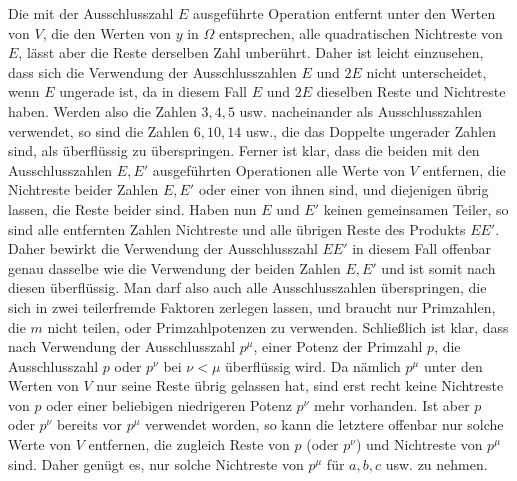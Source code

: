 Die mit der Ausschlusszahl \(E\) ausgeführte Operation entfernt unter den Werten von \(V\), die den Werten von \(y\) in \(\Omega\) entsprechen, alle quadratischen Nichtreste von \(E\), lässt aber die Reste derselben Zahl unberührt. Daher ist leicht einzusehen, dass sich die Verwendung der Ausschlusszahlen \(E\) und \(2E\) nicht unterscheidet, wenn \(E\) ungerade ist, da in diesem Fall \(E\) und \(2E\) dieselben Reste und Nichtreste haben. Werden also die Zahlen \(3,\allowbreak 4,\allowbreak 5\) usw. nacheinander als Ausschlusszahlen verwendet, so sind die Zahlen \(6,\allowbreak 10,\allowbreak 14\) usw., die das Doppelte ungerader Zahlen sind, als überflüssig zu überspringen. Ferner ist klar, dass die beiden mit den Ausschlusszahlen \(E,\allowbreak E'\) ausgeführten Operationen alle Werte von \(V\) entfernen, die Nichtreste beider Zahlen \(E,\allowbreak E'\) oder einer von ihnen sind, und diejenigen übrig lassen, die Reste beider sind. Haben nun \(E\) und \(E'\) keinen gemeinsamen Teiler, so sind alle entfernten Zahlen Nichtreste und alle übrigen Reste des Produkts \(EE'\). Daher bewirkt die Verwendung der Ausschlusszahl \(EE'\) in diesem Fall offenbar genau dasselbe wie die Verwendung der beiden Zahlen \(E,\allowbreak E'\) und ist somit nach diesen überflüssig. Man darf also auch alle Ausschlusszahlen überspringen, die sich in zwei teilerfremde Faktoren zerlegen lassen, und braucht nur Primzahlen, die \(m\) nicht teilen, oder Primzahlpotenzen zu verwenden. Schließlich ist klar, dass nach Verwendung der Ausschlusszahl \(p^\mu\), einer Potenz der Primzahl \(p\), die Ausschlusszahl \(p\) oder \(p^\nu\) bei \(\nu<\mu\) überflüssig wird. Da nämlich \(p^\mu\) unter den Werten von \(V\) nur seine Reste übrig gelassen hat, sind erst recht keine Nichtreste von \(p\) oder einer beliebigen niedrigeren Potenz \(p^\nu\) mehr vorhanden. Ist aber \(p\) oder \(p^\nu\) bereits vor \(p^\mu\) verwendet worden, so kann die letztere offenbar nur solche Werte von \(V\) entfernen, die zugleich Reste von \(p\) (oder \(p^\nu\)) und Nichtreste von \(p^\mu\) sind. Daher genügt es, nur solche Nichtreste von \(p^\mu\) für \(a,\allowbreak b,\allowbreak c\) usw. zu nehmen.

